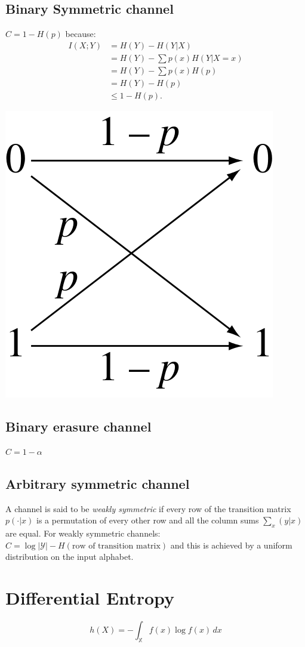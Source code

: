 \documentclass[10pt,a4paper,landscape]{article}
\begin{document}
\begin{multicols*}{4}
\subsection{Binary Symmetric channel}
$C = 1 - H(p)$ because:
\begin{align}
	I(X; Y) &= H(Y) - H(Y | X)\\
			&= H(Y) - \sum p(x) H(Y| X = x)\\
			&= H(Y) - \sum p(x) H(p)\\
			&= H(Y) - H(p)\\
			&\leq 1 - H(p).
\end{align}
\begin{colfig}
	\centering
	\includegraphics[width=0.6\linewidth]{binary-symmetric-channel.png}
\end{colfig}

\subsection{Binary erasure channel}
$C = 1 - \alpha$

\subsection{Arbitrary symmetric channel}
A channel is said to be \emph{weakly symmetric} if every row of the transition matrix $p(\cdot | x)$ is a permutation of every other row and all the column sums $\sum_x (y|x)$ are equal. For weakly symmetric channels:
$C = \log | \mathcal{Y} | - H(\text{row of transition matrix})$
and this is achieved by a uniform distribution on the input alphabet.

\section{Differential Entropy}
$$h(X) = -\int_\mathbb{X} f(x)\log f(x)\,dx$$


\end{multicols*}
\end{document}
